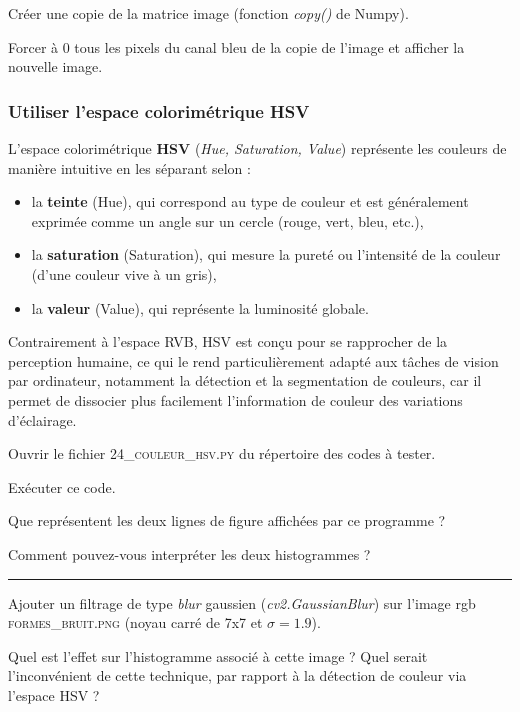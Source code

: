 \documentclass[a4paper,11pt,titlepage]{article} %
\begin{document}
\Manip Créer une copie de la matrice image (fonction \textsl{copy()} de Numpy). 

\Manip Forcer à 0 tous les pixels du canal bleu de la copie de l'image et afficher la nouvelle image.


\subsubsection{Utiliser l'espace colorimétrique HSV}

L'espace colorimétrique \textbf{HSV} (\textit{Hue, Saturation, Value}) représente les couleurs de manière intuitive en les séparant selon :

\begin{itemize}
	\item la \textbf{teinte} (Hue), qui correspond au type de couleur et est généralement exprimée comme un angle sur un cercle (rouge, vert, bleu, etc.), 
	\item la \textbf{saturation} (Saturation), qui mesure la pureté ou l'intensité de la couleur (d'une couleur vive à un gris),
	\item la \textbf{valeur} (Value), qui représente la luminosité globale.
\end{itemize} 

\medskip

Contrairement à l'espace RVB, HSV est conçu pour se rapprocher de la perception humaine, ce qui le rend particulièrement adapté aux tâches de vision par ordinateur, notamment la détection et la segmentation de couleurs, car il permet de dissocier plus facilement l'information de couleur des variations d'éclairage.

\Manip Ouvrir le fichier \textsc{24\_couleur\_hsv.py} du répertoire des codes à tester.

\Manip Exécuter ce code.

\Quest Que représentent les deux lignes de figure affichées par ce programme ?

\Quest Comment pouvez-vous interpréter les deux histogrammes ?

\noindent \rule{\linewidth}{1pt}

\Manip Ajouter un filtrage de type \textit{blur} gaussien (\textit{cv2.GaussianBlur}) sur l'image rgb \textsc{formes\_bruit.png} (noyau carré de 7x7 et $\sigma = 1.9$).

\Quest Quel est l'effet sur l'histogramme associé à cette image ? Quel serait l'inconvénient de cette technique, par rapport à la détection de couleur via l'espace HSV ?
\end{document}
